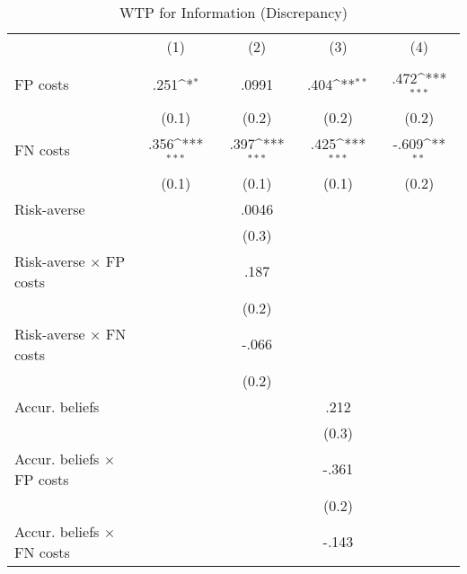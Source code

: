 \begin{table}[htbp]\centering
\def\sym#1{\ifmmode^{#1}\else\(^{#1}\)\fi}
\caption{WTP for Information (Discrepancy)}
\begin{tabular}{l*{4}{c}}
\hline\hline
                &\multicolumn{1}{c}{(1)}&\multicolumn{1}{c}{(2)}&\multicolumn{1}{c}{(3)}&\multicolumn{1}{c}{(4)}\\
                &\multicolumn{1}{c}{}&\multicolumn{1}{c}{}&\multicolumn{1}{c}{}&\multicolumn{1}{c}{}\\
\hline
FP costs        &     .251\sym{*}  &    .0991         &     .404\sym{**} &     .472\sym{***}\\
                &    (0.1)         &    (0.2)         &    (0.2)         &    (0.2)         \\
FN costs        &     .356\sym{***}&     .397\sym{***}&     .425\sym{***}&    -.609\sym{**} \\
                &    (0.1)         &    (0.1)         &    (0.1)         &    (0.2)         \\
Risk-averse     &                  &    .0046         &                  &                  \\
                &                  &    (0.3)         &                  &                  \\
Risk-averse $\times$ FP costs&                  &     .187         &                  &                  \\
                &                  &    (0.2)         &                  &                  \\
Risk-averse $\times$ FN costs&                  &    -.066         &                  &                  \\
                &                  &    (0.2)         &                  &                  \\
Accur. beliefs  &                  &                  &     .212         &                  \\
                &                  &                  &    (0.3)         &                  \\
Accur. beliefs $\times$ FP costs&                  &                  &    -.361         &                  \\
                &                  &                  &    (0.2)         &                  \\
Accur. beliefs $\times$ FN costs&                  &                  &    -.143         &                  \\

\end{tabular}
\end{table}
